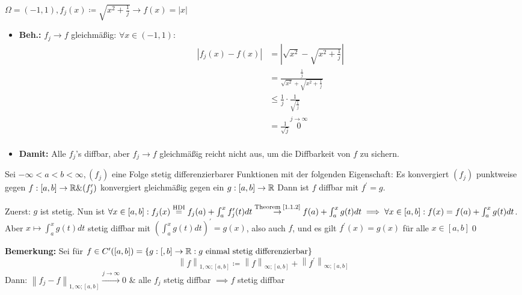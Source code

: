 \begin{subexample}
	$ \Omega = (-1, 1), f_j(x) \coloneqq \sqrt{x^2 + \frac{ 1 }{ j } } \to f(x) = \left| x \right|  $ 
	\begin{itemize}
		\item \textbf{Beh.:} $ f_j \to f $ gleichmäßig: $ \forall x \in (-1, 1): $
			\begin{align*}
				\left| f_j(x) - f(x) \right| &= \left| \sqrt{x^2} - \sqrt{x^2 + \frac{ 1 }{ j } }  \right|  \\
				~&= \frac{ \frac{ 1 }{ j } }{ \sqrt{x^2} + \sqrt{x^2 + \frac{ 1 }{ j } }  }  \\
				~&\leq \frac{ 1 }{ j } \cdot \frac{ 1 }{ \sqrt{\frac{ 1 }{ j } }  }  \\
				~&= \frac{ 1 }{ \sqrt{j}  } \overset{j \to \infty}{0} \\
			\end{align*}
		\item \textbf{Damit:} Alle $ f_j $'s diffbar, aber $ f_j \to f $ gleichmäßig reicht nicht aus, um die Diffbarkeit von $ f $ zu sichern.
	\end{itemize}
\end{subexample}

\begin{subtheorem}
	Sei $ -\infty < a < b < \infty, (f_j) $ eine Folge stetig differenzierbarer Funktionen mit der folgenden Eigenschaft: Es konvergiert $ (f_j) $ punktweise gegen $ f:[a,b] \to \mathbb{R} \& (f_j^\prime) $ konvergiert gleichmäßig gegen ein $ g:[a,b] \to \mathbb{R}  $ Dann ist $ f $ diffbar mit $ f^\prime = g $.
\end{subtheorem}

\begin{subproof*}
	Zuerst: $ g $ ist stetig. Nun ist $ \forall x \in [a, b] : f_j(x) \overset{\text{HDI} }{=} f_j(a) + \int_{a}^{x} f_j^\prime(t) dt \overset{\text{Theorem \ref{1.1.2}} }{\to } f(a) + \int_{a}^{x}g(t) dt \implies  \forall x \in [a, b] : f(x) = f(a) + \int_{a}^{x}g(t) dt $.
	Aber $ x\mapsto \int_{a}^{x}g(t) dt $ stetig diffbar mit $ \left( \int_{a}^{x}g(t)dt \right) ^\prime = g(x) $, also auch $ f $, und es gilt $ f^\prime(x) = g(x) $ für alle $ x \in [a,b] $\qed 
\end{subproof*}

\textbf{Bemerkung:}
Sei für $ f \in C^\prime([a, b]) = \left\{ g : [, b] \to \mathbb{R} : g \text{ einmal stetig differenzierbar}  \right\}  $ 
\[
	\left\| f \right\| _{1, \infty; [a, b]} \coloneqq \left\| f \right\| _{\infty;[a, b]} + \left\| f^\prime \right\| _{\infty;[a, b]} 
\]
Dann: $ \left\| f_j - f \right\| _{1, \infty; [a, b]} \overset{j\to \infty}{\to } 0 $ \& alle $ f_j  $ stetig diffbar $ \implies  f $ stetig diffbar

